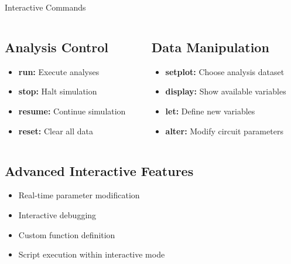 \documentclass{beamer}
\begin{document}
\begin{frame}{Interactive Commands}
    \begin{columns}
        \begin{column}{0.5\textwidth}
            \subsection{Analysis Control}
            \begin{itemize}
                \item \textbf{run:} Execute analyses
                \item \textbf{stop:} Halt simulation
                \item \textbf{resume:} Continue simulation
                \item \textbf{reset:} Clear all data
            \end{itemize}
        \end{column}
        \begin{column}{0.5\textwidth}
            \subsection{Data Manipulation}
            \begin{itemize}
                \item \textbf{setplot:} Choose analysis dataset
                \item \textbf{display:} Show available variables
                \item \textbf{let:} Define new variables
                \item \textbf{alter:} Modify circuit parameters
            \end{itemize}
        \end{column}
    \end{columns}
    
    \subsection{Advanced Interactive Features}
    \begin{itemize}
        \item Real-time parameter modification
        \item Interactive debugging
        \item Custom function definition
        \item Script execution within interactive mode
    \end{itemize}
\end{frame}
\end{document}

